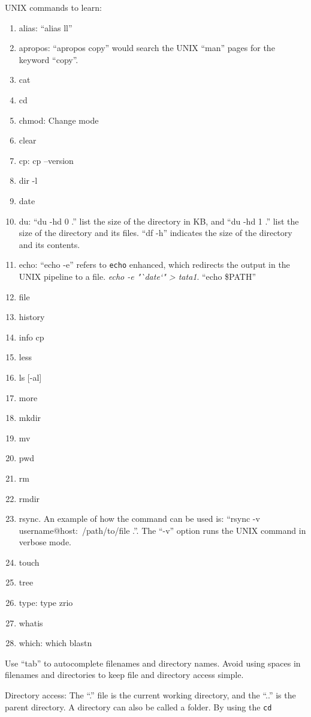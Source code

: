UNIX commands to learn: \vspace{-0.3cm}
\begin{enumerate}	\itemsep -4pt
	\item alias: ``alias ll''
	\item apropos: ``apropos copy'' would search the UNIX ``man'' pages for the keyword ``copy''.
	\item cat
	\item cd
	\item chmod: Change mode
	\item clear
	\item cp: cp --version
	\item dir -l
	\item date
	\item du: ``du -hd 0 .'' list the size of the directory in KB, and ``du -hd 1 .'' list the size of the directory and its files. ``df -h'' indicates the size of the directory and its contents. 
	\item echo: ``echo -e'' refers to {\tt echo} enhanced, which redirects the output in the UNIX pipeline to a file. {\it echo -e "`date`" > tata1}. ``echo \$PATH''
	\item file
	\item history
	\item info cp
	\item less
	\item ls [-al]
	\item more
	\item mkdir
	\item mv
	\item pwd
	\item rm
	\item rmdir
	\item rsync. An example of how the command can be used is: ``rsync -v username@host:~/path/to/file .''. The ``-v'' option runs the UNIX command in verbose mode.
	\item touch
	\item tree
	\item type: type zrio
	\item whatis
	\item which: which blastn
\end{enumerate}


Use ``tab'' to autocomplete filenames and directory names. Avoid using spaces in filenames and directories to keep file and directory access simple.

Directory access: The ``.'' file is the current working directory, and the ``..'' is the parent directory. A directory can also be called a folder. By using the {\tt cd}

